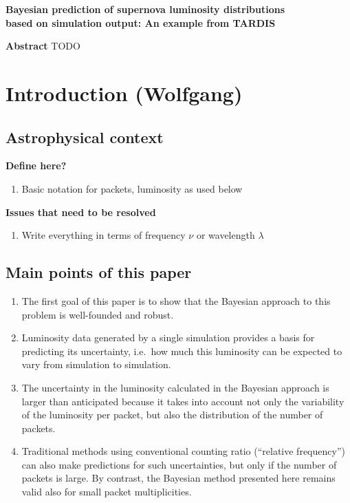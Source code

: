 \documentclass[11pt]{article}
\newcommand{\tardis}{TARDIS}
\begin{document}
\begin{center}
  \textbf{\Large Bayesian prediction of supernova luminosity  distributions}\\[8pt]
  \textbf{\Large based on simulation output: An example from \tardis}\\[12pt]
\end{center}

\textbf{Abstract} TODO\\

\section{Introduction (Wolfgang)}

\subsection{Astrophysical context}

\textbf{Define here?}
\begin{enumerate}
\item Basic notation for packets, luminosity as used below
\end{enumerate}

\textbf{Issues that need to be resolved}
\begin{enumerate}
\item Write everything in terms of frequency $\nu$ or wavelength $\lambda$
\end{enumerate}

\subsection*{Main points of this paper}

\begin{enumerate}
\item The first goal of this paper is to show that the Bayesian
  approach to this problem is well-founded and robust.

\item Luminosity data generated by a single simulation provides a
  basis for predicting its uncertainty, i.e.\ how much this luminosity
  can be expected to vary from simulation to simulation.

\item The uncertainty in the luminosity calculated in the Bayesian
  approach is larger than anticipated because it takes into account
  not only the variability of the luminosity per packet, but also the
  distribution of the number of packets.

\item Traditional methods using conventional counting ratio
  (``relative frequency'') can also make predictions for such
  uncertainties, but only if the number of packets is large. By
  contrast, the Bayesian method presented here remains valid also for
  small packet multiplicities.

\end{enumerate}
\end{document}
